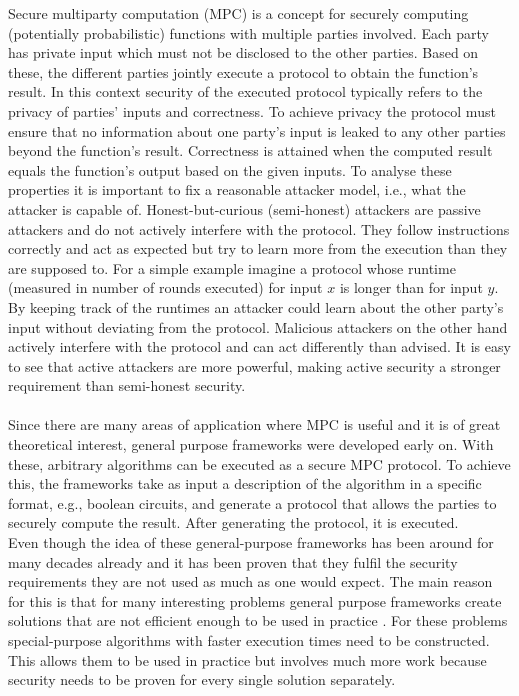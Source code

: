 Secure multiparty computation (MPC) is a concept for securely computing (potentially probabilistic) functions with multiple parties involved. Each party has private input which must not be disclosed to the other parties. Based on these, the different parties jointly execute a protocol to obtain the function's result. In this context security of the executed protocol typically refers to the privacy of parties' inputs and correctness. To achieve privacy the protocol must ensure that no information about one party's input is leaked to any other parties beyond the function's result. Correctness is attained when the computed result equals the function's output based on the given inputs. To analyse these properties it is important to fix a reasonable attacker model, i.e., what the attacker is capable of. Honest-but-curious (semi-honest) attackers are passive attackers and do not actively interfere with the protocol. They follow instructions correctly and act as expected but try to learn more from the execution than they are supposed to. For a simple example imagine a protocol whose runtime (measured in number of rounds executed) for input $x$ is longer than for input $y$. By keeping track of the runtimes an attacker could learn about the other party's input without deviating from the protocol. Malicious attackers on the other hand actively interfere with the protocol and can act differently than advised. It is easy to see that active attackers are more powerful, making active security a stronger requirement than semi-honest security.\\
\ \\Since there are many areas of application where MPC is useful and it is of great theoretical interest, general purpose frameworks were developed early on. With these, arbitrary algorithms can be executed as a secure MPC protocol. To achieve this, the frameworks take as input a description of the algorithm in a specific format, e.g., boolean circuits, and generate a protocol that allows the parties to securely compute the result. After generating the protocol, it is executed.\\ 
Even though the idea of these general-purpose frameworks has been around for many decades already and it has been proven that they fulfil the security requirements they are not used as much as one would expect. The main reason for this is that for many interesting problems general purpose frameworks create solutions that are not efficient enough to be used in practice \citep{sok, mpusp, htpamg, htgaes}. For these problems special-purpose algorithms with faster execution times need to be constructed. This allows them to be used in practice but involves much more work because security needs to be proven for every single solution separately. \\
